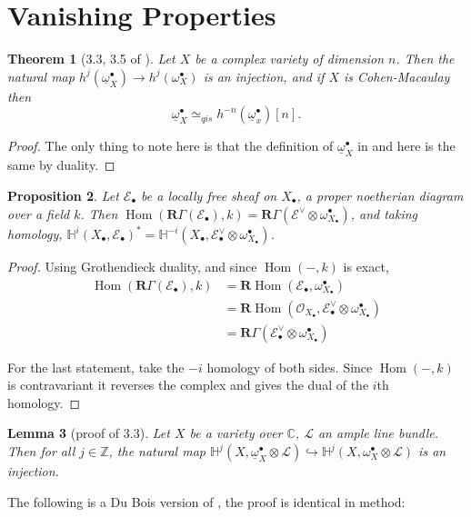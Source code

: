 \documentclass{report}
\newtheorem{theorem}{Theorem}[section]
\newtheorem{prop}[theorem]{Proposition}
\newtheorem{lemma}[theorem]{Lemma}
\theoremstyle{definition}
\DeclareMathOperator{\Hom}{Hom}
\newcommand{\CC}{\mathbb{C}}
\newcommand{\EE}{\mathscr{E}}
\newcommand{\HH}{\mathbb{H}}
\newcommand{\LL}{\mathcal{L}}
\newcommand{\OO}{\mathcal{O}}
\newcommand{\qis}{\simeq_{qis}}
\newcommand{\bR}{\textbf{R}}
\newcommand{\ZZ}{\mathbb{Z}}
\newcommand{\db}{\underline{\omega}^\bullet}
\begin{document}
\section{Vanishing Properties}

\begin{theorem}[3.3, 3.5 of \cite{Kovacs2011a}]
	\label{thm:duboisgr}
	Let $X$ be a complex variety of dimension $n$.
	Then the natural map $h^j (\db_X) \rightarrow h^j (\omega_X^\bullet)$ is an injection, and if $X$ is Cohen-Macaulay then
	\[
		\db_X \qis h^{-n} (\db_x)[n].
	\]
\end{theorem}
\begin{proof}
	The only thing to note here is that the definition of $\db_X$ in \cite{Kovacs2011a} and here is the same by duality.
\end{proof}

\begin{prop}
	\label{prp:cohofdual}
	Let $\EE_\bullet$ be a locally free sheaf on $X_\bullet$, a proper noetherian diagram over a field $k$.
	Then $\Hom(\bR \Gamma(\EE_\bullet),k) = \bR \Gamma(\EE^\vee \otimes \omega_{X_\bullet}^\bullet)$, and taking homology,
	$\HH^i (X_\bullet, \EE_\bullet)^* = \HH^{-i}(X_\bullet, \EE_\bullet^\vee \otimes \omega_{X_\bullet}^\bullet)$.
\end{prop}
\begin{proof}
	Using Grothendieck duality, and since $\Hom(-,k)$ is exact,
	\begin{align*}
		\Hom(\bR \Gamma(\EE_\bullet),k) &= \bR \Hom(\EE_\bullet, \omega_{X_\bullet}^\bullet) \\
		&= \bR \Hom(\OO_{X_\bullet}, \EE_\bullet^\vee \otimes \omega_{X_\bullet}^\bullet) \\
		&= \bR \Gamma(\EE_\bullet^\vee \otimes \omega_{X_\bullet}^\bullet)
	\end{align*}
	
	For the last statement, take the $-i$ homology of both sides.
	Since $\Hom(-,k)$ is contravariant it reverses the complex and gives the dual of the $i$th homology.
\end{proof}

\begin{lemma}[proof of \cite{Kovacs2011a} 3.3]
	Let $X$ be a variety over $\CC$, $\LL$ an ample line bundle.
	Then for all $j \in \ZZ$, the natural map
	$\HH^j(X, \db_X \otimes \LL) \hookrightarrow \HH^j(X,\omega_X^\bullet \otimes \LL)$ is an injection.
\end{lemma}

The following is a Du Bois version of \cite{Kovacs1999}, the proof is identical in method:
\end{document}
